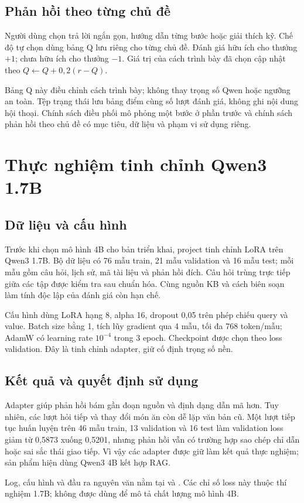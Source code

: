 \subsection{Phản hồi theo từng chủ đề}
Người dùng chọn trả lời ngắn gọn, hướng dẫn từng bước hoặc giải thích kỹ. Chế độ tự chọn dùng bảng Q lưu riêng cho từng chủ đề. Đánh giá hữu ích cho thưởng $+1$; chưa hữu ích cho thưởng $-1$. Giá trị của cách trình bày đã chọn cập nhật theo $Q\leftarrow Q+0,2(r-Q)$.

Bảng Q này điều chỉnh cách trình bày; không thay trọng số Qwen hoặc ngưỡng an toàn. Tệp trạng thái lưu bảng điểm cùng số lượt đánh giá, không ghi nội dung hội thoại. Chính sách điều phối mô phỏng một bước ở phần trước và chính sách phản hồi theo chủ đề có mục tiêu, dữ liệu và phạm vi sử dụng riêng.
\section{Thực nghiệm tinh chỉnh Qwen3 1.7B}
\subsection{Dữ liệu và cấu hình}
Trước khi chọn mô hình 4B cho bản triển khai, project tinh chỉnh LoRA trên Qwen3 1.7B. Bộ dữ liệu có 76 mẫu train, 21 mẫu validation và 16 mẫu test; mỗi mẫu gồm câu hỏi, lịch sử, mã tài liệu và phản hồi đích. Câu hỏi trùng trực tiếp giữa các tập được kiểm tra sau chuẩn hóa. Cùng nguồn KB và cách biên soạn làm tính độc lập của đánh giá còn hạn chế.

Cấu hình dùng LoRA hạng 8, alpha 16, dropout 0,05 trên phép chiếu query và value. Batch size bằng 1, tích lũy gradient qua 4 mẫu, tối đa 768 token/mẫu; AdamW có learning rate $10^{-4}$ trong 3 epoch. Checkpoint được chọn theo loss validation. Đây là tinh chỉnh adapter, giữ cố định trọng số nền.

\subsection{Kết quả và quyết định sử dụng}
Adapter giúp phản hồi bám gần đoạn nguồn và định dạng dẫn mã hơn. Tuy nhiên, các lượt hỏi tiếp và thay đổi món ăn còn dễ lặp văn bản cũ. Một lượt tiếp tục huấn luyện trên 46 mẫu train, 13 validation và 16 test làm validation loss giảm từ 0,5873 xuống 0,5201, nhưng phản hồi vẫn có trường hợp sao chép chỉ dẫn hoặc sai sắc thái giao tiếp. Vì vậy các adapter được giữ làm kết quả thực nghiệm; sản phẩm hiện dùng Qwen3 4B kết hợp RAG.

Log, cấu hình và đầu ra nguyên văn nằm tại  và . Các chỉ số loss này thuộc thí nghiệm 1.7B; không được dùng để mô tả chất lượng mô hình 4B.

